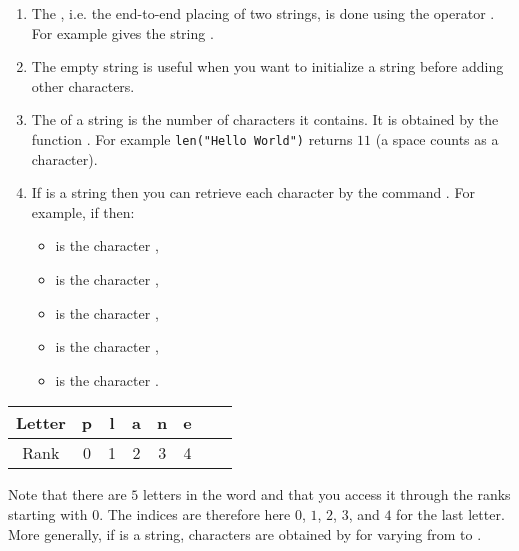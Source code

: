 \documentclass[11pt,class=report,crop=false]{standalone}
\begin{document}
\begin{cours}
\sauteligne
\begin{enumerate}
  \item The , i.e. the end-to-end placing of two strings, is done using the operator \ci{+}. For example  gives the string .
 
  \item The empty string  is useful when you want to initialize a string before adding other characters.
  
  \item The  of a string is the number of characters it contains. It is obtained by the function .
  For example \lstinline[showstringspaces=true]!len("Hello World")! returns $11$ (a space counts as a character).
  
  \item If  is a string then you can retrieve each character by the command . For example, if 
   then:
  \begin{itemize}
    \item {} is the character ,
    \item {} is the character , 
    \item {} is the character ,
    \item {} is the character ,       
    \item {} is the character .
  \end{itemize} 
\end{enumerate}  

\begin{center}
\begin{tabular}{|c||c|c|c|c|c|c|c|}
\hline
Letter & p & l & a & n & e \\ \hline
Rank   & 0 & 1 & 2 & 3 & 4 \\ \hline
\end{tabular}
\end{center}

  Note that there are $5$ letters in the word  and that you access it through the ranks starting with $0$. The indices are therefore here $0$, $1$, $2$, $3$, and $4$ for the last letter.  More generally, if  is a string, characters are obtained by  for  varying from  to .
\end{cours}
\end{document}
